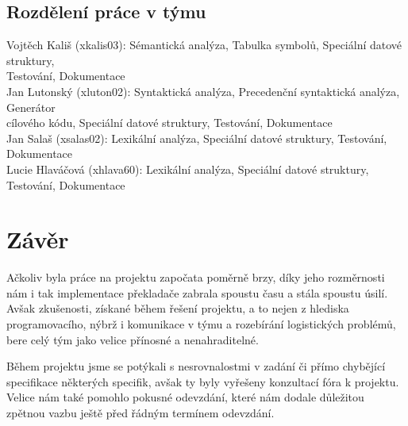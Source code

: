 \documentclass[a4paper, 11pt]{article}
\begin{document}
	\subsection{Rozdělení práce v týmu}
		\hspace*{0.25cm}	Vojtěch Kališ (xkalis03): \hspace{0.2cm} Sémantická analýza, Tabulka symbolů, Speciální datové struktury,\\
		\hspace*{5.08cm} Testování, Dokumentace\\
		\hspace*{0.8cm} 	Jan Lutonský (xluton02): \hspace{0.2cm} Syntaktická analýza, Precedenční syntaktická analýza, Generátor\\
		\hspace*{5.08cm} cílového kódu, Speciální datové struktury, Testování, Dokumentace\\
		\hspace*{1.5cm}	Jan Salaš (xsalas02): \hspace{0.2cm} Lexikální analýza, Speciální datové struktury, Testování, Dokumentace\\
		\hspace*{0.25cm}	Lucie Hlaváčová (xhlava60): \hspace{0.2cm} Lexikální analýza, Speciální datové struktury, Testování, Dokumentace\\
	\section{Závěr}
	Ačkoliv byla práce na projektu započata poměrně brzy, díky jeho rozměrnosti nám i tak implementace překladače zabrala spoustu času a stála spoustu úsilí. 
	Avšak zkušenosti, získané během řešení projektu, a to nejen z hlediska programovacího, nýbrž i komunikace v týmu a rozebírání logistických problémů, 
	bere celý tým jako velice přínosné a nenahraditelné. 

	Během projektu jsme se potýkali s nesrovnalostmi v zadání či přímo chybějící specifikace některých specifik, avšak ty byly vyřešeny konzultací fóra k projektu. 
	Velice nám také pomohlo pokusné odevzdání, které nám dodale důležitou zpětnou vazbu ještě před řádným termínem odevzdání.
	\newpage
	
	\begingroup\centering
\end{document}
